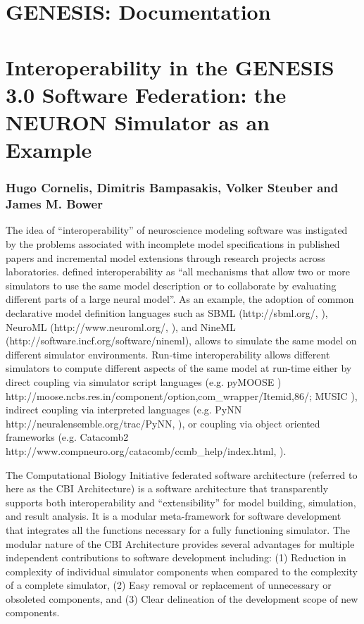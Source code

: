 \documentclass[12pt]{article}
\begin{document}
\section*{GENESIS: Documentation}

\section*{Interoperability in the GENESIS 3.0 Software Federation: the
  NEURON Simulator as an Example}

\subsubsection*{Hugo Cornelis, Dimitris Bampasakis, Volker Steuber and
  James M.  Bower}

The idea of ``interoperability'' of neuroscience modeling software was instigated by the problems associated with incomplete model specifications in published papers and incremental model extensions through research projects across laboratories.  \cite{cannon07:_inter} defined interoperability as ``all mechanisms that allow two or more simulators to use the same model description or to collaborate by evaluating different parts of a large neural model''.  As an example, the adoption of common declarative model definition languages such as SBML (http://sbml.org/, \cite{Hucka-M:2004bh}), NeuroML (http://www.neuroml.org/, \cite{Gleeson:2010cr}), and NineML (http://software.incf.org/software/nineml), allows to simulate the same model on different simulator environments.  Run-time interoperability allows different simulators to compute different aspects of the same model at run-time either by direct coupling via simulator script languages (e.g. pyMOOSE \cite{ray08:_pymoos}) http://moose.ncbs.res.in/component/option,com\_wrapper/Itemid,86/; MUSIC \cite{Djurfeldt:2010fk}), indirect coupling via interpreted languages (e.g. PyNN http://neuralensemble.org/trac/PyNN, \cite{davison08:_pynn}), or coupling via object oriented frameworks (e.g.  Catacomb2 http://www.compneuro.org/catacomb/ccmb\_help/index.html, \cite{cannon03:_from}).

The Computational Biology Initiative federated software architecture (referred to here as the CBI Architecture) is a software architecture that transparently supports both interoperability and ``extensibility'' for model building, simulation, and result analysis.  It is a modular meta-framework for software development that integrates all the functions necessary for a fully functioning simulator.  The modular nature of the CBI Architecture provides several advantages for multiple independent contributions to software development including: (1) Reduction in complexity of individual simulator components when compared to the complexity of a complete simulator, (2) Easy removal or replacement of unnecessary or obsoleted components, and (3) Clear delineation of the development scope of new components.
\end{document}
